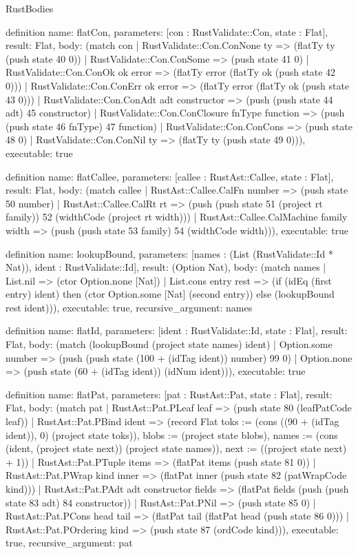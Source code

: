 \begin{lexlean}{RustBodies}
\begin{semanticmodule}
definition{
  name: flatCon,
  parameters: [con : RustValidate::Con, state : Flat],
  result: Flat,
  body: (match con
    | RustValidate::Con.ConNone ty => (flatTy ty (push state 40 0))
    | RustValidate::Con.ConSome => (push state 41 0)
    | RustValidate::Con.ConOk ok error => (flatTy error (flatTy ok (push state 42 0)))
    | RustValidate::Con.ConErr ok error => (flatTy error (flatTy ok (push state 43 0)))
    | RustValidate::Con.ConAdt adt constructor => (push (push state 44 adt) 45 constructor)
    | RustValidate::Con.ConClosure fnType function => (push (push state 46 fnType) 47 function)
    | RustValidate::Con.ConCons => (push state 48 0)
    | RustValidate::Con.ConNil ty => (flatTy ty (push state 49 0))),
  executable: true
}

definition{
  name: flatCallee,
  parameters: [callee : RustAst::Callee, state : Flat],
  result: Flat,
  body: (match callee
    | RustAst::Callee.CalFn number => (push state 50 number)
    | RustAst::Callee.CalRt rt => (push (push state 51 (project rt family)) 52 (widthCode (project rt width)))
    | RustAst::Callee.CalMachine family width => (push (push state 53 family) 54 (widthCode width))),
  executable: true
}

definition{
  name: lookupBound,
  parameters: [names : (List (RustValidate::Id * Nat)), ident : RustValidate::Id],
  result: (Option Nat),
  body: (match names
    | List.nil => (ctor Option.none [Nat])
    | List.cons entry rest => (if (idEq (first entry) ident) then (ctor Option.some [Nat] (second entry)) else (lookupBound rest ident))),
  executable: true,
  recursive_argument: names
}

definition{
  name: flatId,
  parameters: [ident : RustValidate::Id, state : Flat],
  result: Flat,
  body: (match (lookupBound (project state names) ident)
    | Option.some number => (push (push state (100 + (idTag ident)) number) 99 0)
    | Option.none => (push state (60 + (idTag ident)) (idNum ident))),
  executable: true
}

definition{
  name: flatPat,
  parameters: [pat : RustAst::Pat, state : Flat],
  result: Flat,
  body: (match pat
    | RustAst::Pat.PLeaf leaf => (push state 80 (leafPatCode leaf))
    | RustAst::Pat.PBind ident => (record Flat {toks := (cons ((90 + (idTag ident)), 0) (project state toks)), blobs := (project state blobs), names := (cons (ident, (project state next)) (project state names)), next := ((project state next) + 1)})
    | RustAst::Pat.PTuple items => (flatPat items (push state 81 0))
    | RustAst::Pat.PWrap kind inner => (flatPat inner (push state 82 (patWrapCode kind)))
    | RustAst::Pat.PAdt adt constructor fields => (flatPat fields (push (push state 83 adt) 84 constructor))
    | RustAst::Pat.PNil => (push state 85 0)
    | RustAst::Pat.PCons head tail => (flatPat tail (flatPat head (push state 86 0)))
    | RustAst::Pat.POrdering kind => (push state 87 (ordCode kind))),
  executable: true,
  recursive_argument: pat
}


\end{semanticmodule}
\end{lexlean}
